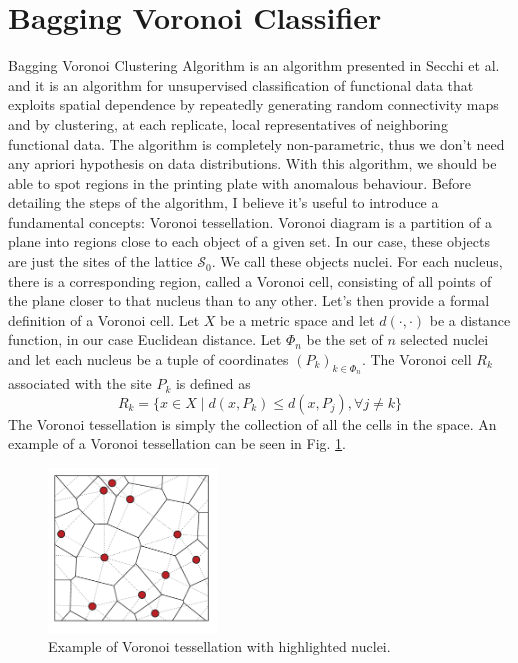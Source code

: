 \section{Bagging Voronoi Classifier}
\label{sec:bvc}
Bagging Voronoi Clustering Algorithm is an algorithm presented in Secchi et al. \cite{secchi_bagging_2013} and it is an algorithm for unsupervised classification of functional data that exploits spatial dependence by repeatedly generating random connectivity maps and by clustering, at each replicate, local representatives of neighboring functional data. The algorithm is completely non-parametric, thus we don't need any apriori hypothesis on data distributions. With this algorithm, we should be able to spot regions in the printing plate with anomalous behaviour. Before detailing the steps of the algorithm, I believe it's useful to introduce a fundamental concepts: Voronoi tessellation. Voronoi diagram is a partition of a plane into regions close to each object of a given set. In our case, these objects are just the sites of the lattice $\mathcal{S}_0$. We call these objects nuclei. For each nucleus, there is a corresponding region, called a Voronoi cell, consisting of all points of the plane closer to that nucleus than to any other. Let's then provide a formal definition of a Voronoi cell. Let $X$ be a metric space and let $d(\cdot, \cdot)$ be a distance function, in our case Euclidean distance. Let $\Phi_n$ be the set of $n$ selected nuclei and let each nucleus be a tuple of coordinates $\left(P_k\right)_{k\in \Phi_n}$. The Voronoi cell $R_k$ associated with the site $P_k$ is defined as
\begin{equation}
    \label{eq:voronoicell}
    R_k=\{x\in X \mid d(x, P_k)\leq d(x, P_j),\forall j\neq k\}
\end{equation}
The Voronoi tessellation is simply the collection of all the cells in the space.
An example of a Voronoi tessellation can be seen in Fig. \ref{fig:voronoi}.
\begin{figure}[H]
    \centering
    \includegraphics[width=0.4\textwidth]{Images/A-set-of-atoms-the-associated-Voronoi-tessellation-solid-lines-and-the-Delaunay.png}
    \caption[Voronoi tessellation.]{Example of Voronoi tessellation with highlighted nuclei.}
    \label{fig:voronoi}
\end{figure}


